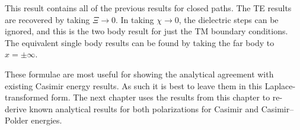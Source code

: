 This result contains all of the previous results for closed paths.  
The TE results are recovered by taking $\Xi\rightarrow 0$.
In taking $\chi\rightarrow 0$, the dielectric steps can be ignored, and this is the two body result for just the TM
boundary conditions.  
The equivalent single body results can be found by taking the far body to $x=\pm\infty$.  

These formulae are most useful for showing the analytical agreement with existing 
Casimir energy results.  As such it is best to leave them in this Laplace-transformed form.  
The next chapter uses the results from this chapter to re-derive known analytical results for both 
polarizations for Casimir and Casimir--Polder energies.  

